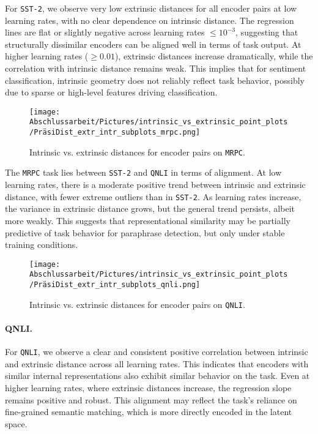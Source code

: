 For \texttt{SST-2}, we observe very low extrinsic distances for all encoder pairs at low learning rates, with no clear dependence on intrinsic distance.  
The regression lines are flat or slightly negative across learning rates \( \leq 10^{-3} \), suggesting that structurally dissimilar encoders can be aligned well in terms of task output.  
At higher learning rates (\( \geq 0.01 \)), extrinsic distances increase dramatically, while the correlation with intrinsic distance remains weak.  
This implies that for sentiment classification, intrinsic geometry does not reliably reflect task behavior, possibly due to sparse or high-level features driving classification.

\begin{figure}[H]
	\centering
	\texttt{[image: Abschlussarbeit/Pictures/intrinsic\_vs\_extrinsic\_point\_plots/PräsiDist\_extr\_intr\_subplots\_mrpc.png]}
	\caption{Intrinsic vs. extrinsic distances for encoder pairs on \texttt{MRPC}.}
	\label{fig:intrinsic_vs_extrinsic_mrpc}
\end{figure}


The \texttt{MRPC} task lies between \texttt{SST-2} and \texttt{QNLI} in terms of alignment.  
At low learning rates, there is a moderate positive trend between intrinsic and extrinsic distance, with fewer extreme outliers than in \texttt{SST-2}.  
As learning rates increase, the variance in extrinsic distance grows, but the general trend persists, albeit more weakly.  
This suggests that representational similarity may be partially predictive of task behavior for paraphrase detection, but only under stable training conditions.

\begin{figure}[H]
	\centering
	\texttt{[image: Abschlussarbeit/Pictures/intrinsic\_vs\_extrinsic\_point\_plots/PräsiDist\_extr\_intr\_subplots\_qnli.png]}
	\caption{Intrinsic vs. extrinsic distances for encoder pairs on \texttt{QNLI}.}
	\label{fig:intrinsic_vs_extrinsic_qnli}
\end{figure}

\paragraph{QNLI.}
For \texttt{QNLI}, we observe a clear and consistent positive correlation between intrinsic and extrinsic distance across all learning rates.  
This indicates that encoders with similar internal representations also exhibit similar behavior on the task.  
Even at higher learning rates, where extrinsic distances increase, the regression slope remains positive and robust.  
This alignment may reflect the task's reliance on fine-grained semantic matching, which is more directly encoded in the latent space.


